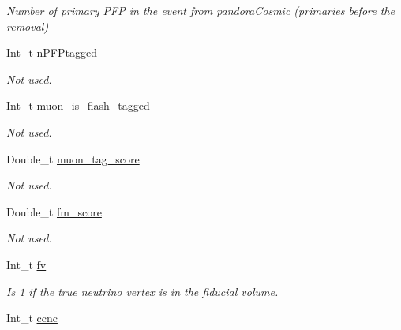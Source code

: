 \begin{DoxyCompactItemize}
\begin{DoxyCompactList}\small\item\em Number of primary P\-F\-P in the event from pandora\-Cosmic (primaries before the removal) \end{DoxyCompactList}\item 
\hypertarget{classUBXSecEvent_a64e18b32773515202fcb167d1818133b}{Int\-\_\-t \hyperlink{classUBXSecEvent_a64e18b32773515202fcb167d1818133b}{n\-P\-F\-Ptagged}}\label{classUBXSecEvent_a64e18b32773515202fcb167d1818133b}

\begin{DoxyCompactList}\small\item\em Not used. \end{DoxyCompactList}\item 
\hypertarget{classUBXSecEvent_a33857278922a2779d3daaf30624a2462}{Int\-\_\-t \hyperlink{classUBXSecEvent_a33857278922a2779d3daaf30624a2462}{muon\-\_\-is\-\_\-flash\-\_\-tagged}}\label{classUBXSecEvent_a33857278922a2779d3daaf30624a2462}

\begin{DoxyCompactList}\small\item\em Not used. \end{DoxyCompactList}\item 
\hypertarget{classUBXSecEvent_a492e788ae84c0ac6c847b7ba95656706}{Double\-\_\-t \hyperlink{classUBXSecEvent_a492e788ae84c0ac6c847b7ba95656706}{muon\-\_\-tag\-\_\-score}}\label{classUBXSecEvent_a492e788ae84c0ac6c847b7ba95656706}

\begin{DoxyCompactList}\small\item\em Not used. \end{DoxyCompactList}\item 
\hypertarget{classUBXSecEvent_af45f0efa722a046884ec4f6c36b77d9a}{Double\-\_\-t \hyperlink{classUBXSecEvent_af45f0efa722a046884ec4f6c36b77d9a}{fm\-\_\-score}}\label{classUBXSecEvent_af45f0efa722a046884ec4f6c36b77d9a}

\begin{DoxyCompactList}\small\item\em Not used. \end{DoxyCompactList}\item 
\hypertarget{classUBXSecEvent_a3b05f41e3b302767d921996aed6f0d87}{Int\-\_\-t \hyperlink{classUBXSecEvent_a3b05f41e3b302767d921996aed6f0d87}{fv}}\label{classUBXSecEvent_a3b05f41e3b302767d921996aed6f0d87}

\begin{DoxyCompactList}\small\item\em Is 1 if the true neutrino vertex is in the fiducial volume. \end{DoxyCompactList}\item 
\hypertarget{classUBXSecEvent_a6a55ef25451d4a8206055d588b052caf}{Int\-\_\-t \hyperlink{classUBXSecEvent_a6a55ef25451d4a8206055d588b052caf}{ccnc}}\label{classUBXSecEvent_a6a55ef25451d4a8206055d588b052caf}


\end{DoxyCompactItemize}
